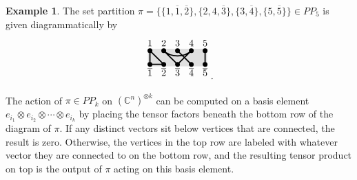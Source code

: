 \documentclass{amsart}
\theoremstyle{definition}
\newtheorem{example}[lemma]{Example}
\newcommand{\C}{\mathbb{C}}
\newcommand{\PP}{P\!P}
\newcommand{\ov}[1]{\overline{#1}}
\begin{document}
\begin{example} \label{ex:diagram_PP5}
	The set partition $\pi=\{\{1,\overline1,\overline2\},\{2,4,\overline3\},\{3,\overline4\},\{5,\overline5\}\}\in\PP_5$ is given diagrammatically by \[
	\begin{tikzpicture}[xscale=.5,yscale=.5,line width=1.25pt] 
                \foreach \i in {1,...,5}  { \path (\i,1.25) coordinate (T\i); \path(\i,1.8) node {$\i$}; \path (\i,.25) coordinate (B\i); \path(\i,-.3) node {$\ov{\i}$}; } 
                \filldraw[fill= black!12,draw=black!12,line width=4pt]  (T1) -- (T5) -- (B5) -- (B1) -- (T1);
                \draw[black] (T1)--(B1)--(B2)--(T1);
                \draw[black] (B3)--(T2)  .. controls +(.5,-.5) and +(-.5,-.5) .. (T4)--(B3);
                \draw[black] (T3)--(B4);
                \draw[black] (T5)--(B5);
                \foreach \i in {1,...,5}  {\filldraw[fill=black,draw=black,line width = 1pt] (T\i) circle (4pt);
                			     \filldraw[fill=black,draw=black,line width = 1pt] (B\i) circle (4pt);}
       \end{tikzpicture}.\]
\end{example}

The action of $\pi\in\PP_k$ on $(\C^n)^{\otimes k}$ can be computed on a basis element
$e_{i_1}\otimes e_{i_2}\otimes\cdots\otimes e_{i_k}$ by placing the tensor factors
beneath the bottom row of the diagram of $\pi$. If any distinct vectors sit below vertices
that are connected, the result is zero. Otherwise, the vertices in the top row are labeled
with whatever vector they are connected to on the bottom row, and the resulting tensor product
on top is the output of $\pi$ acting on this basis element.
\end{document}
